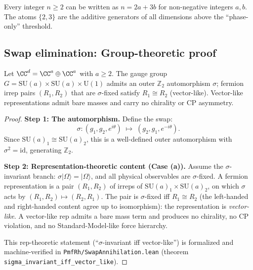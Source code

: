 \begin{remark}
Every integer $n \geq 2$ can be written as $n = 2a + 3b$ for non-negative integers $a, b$. The atoms $\{2, 3\}$ are the additive generators of all dimensions above the ``phase-only'' threshold.
\end{remark}

\subsection{Swap elimination: Group-theoretic proof}

\begin{theorem}
\label{thm:swap}
Let $\CC^d = \CC^a \oplus \CC^a$ with $a \geq 2$.  The gauge group $G = \text{SU}(a) \times \text{SU}(a) \times \text{U}(1)$ admits an outer $\mathbb{Z}_2$ automorphism $\sigma$; fermion irrep pairs $(R_1, R_2)$ that are $\sigma$-fixed satisfy $R_1 \cong R_2$ (vector-like).  Vector-like representations admit bare masses and carry no chirality or CP asymmetry.
\end{theorem}

\begin{proof}
\textbf{Step 1: The automorphism.}
Define the swap:
\begin{equation}
\sigma: (g_1, g_2, e^{i\theta}) \;\mapsto\; (g_2, g_1, e^{-i\theta}).
\end{equation}
Since $\text{SU}(a)_1 \cong \text{SU}(a)_2$, this is a well-defined outer automorphism with $\sigma^2 = \text{id}$, generating $\mathbb{Z}_2$.

\textbf{Step 2: Representation-theoretic content (Case (a)).}
Assume the $\sigma$-invariant branch: $\sigma|\Omega\rangle = |\Omega\rangle$, and all physical observables are $\sigma$-fixed.  A fermion representation is a pair $(R_1, R_2)$ of irreps of $\mathrm{SU}(a)_1 \times \mathrm{SU}(a)_2$, on which $\sigma$ acts by $(R_1, R_2) \mapsto (R_2, R_1)$.  The pair is $\sigma$-fixed iff $R_1 \cong R_2$ (the left-handed and right-handed content agree up to isomorphism): the representation is \emph{vector-like}.  A vector-like rep admits a bare mass term and produces no chirality, no CP violation, and no Standard-Model-like force hierarchy.

This rep-theoretic statement (``$\sigma$-invariant iff vector-like'') is formalized and machine-verified in \texttt{PmfRh/SwapAnnihilation.lean} (theorem \texttt{sigma\_invariant\_iff\_vector\_like}).
\end{proof}

